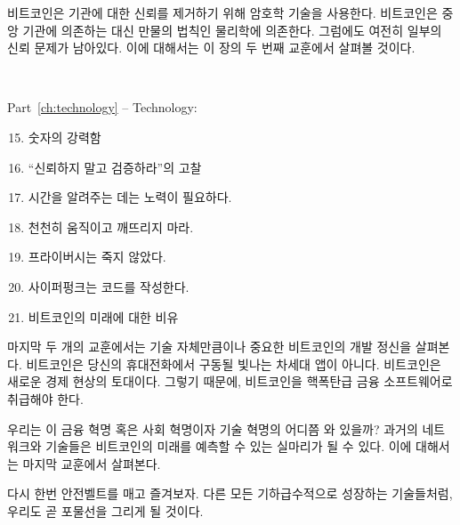 \begin{comment}
	Cryptography is what Bitcoin uses to remove trust in authorities.
	Instead of relying on centralized institutions, the system relies on the final
	authority of our universe: physics. Some grains of trust still remain, however.
	We will examine these grains in the second lesson of this chapter.
\end{comment}
비트코인은 기관에 대한 신뢰를 제거하기 위해 암호학 기술을 사용한다.
비트코인은 중앙 기관에 의존하는 대신 만물의 법칙인 물리학에 의존한다.
그럼에도 여전히 일부의 신뢰 문제가 남아있다.
이에 대해서는 이 장의 두 번째 교훈에서 살펴볼 것이다.

~

\begin{samepage}
	Part~\ref{ch:technology} -- Technology:
	
	\begin{enumerate}
		\setcounter{enumi}{14}
		\item 숫자의 강력함
		\item \enquote{신뢰하지 말고 검증하라}의 고찰
		\item 시간을 알려주는 데는 노력이 필요하다.
		\item 천천히 움직이고 깨뜨리지 마라.
		\item 프라이버시는 죽지 않았다.
		\item 사이퍼펑크는 코드를 작성한다.
		\item 비트코인의 미래에 대한 비유
	\end{enumerate}
\end{samepage}

\begin{comment}
	The last couple of lessons explore the ethos of technological development in
	Bitcoin, which is arguably as important as the technology itself. Bitcoin is not
	the next shiny app on your phone. It is the foundation of a new economic
	reality, which is why Bitcoin should be treated as nuclear-grade financial
	software.
\end{comment}
마지막 두 개의 교훈에서는 기술 자체만큼이나 중요한 비트코인의 개발 정신을 살펴본다.
비트코인은 당신의 휴대전화에서 구동될 빛나는 차세대 앱이 아니다.
비트코인은 새로운 경제 현상의 토대이다. 
그렇기 때문에, 비트코인을 핵폭탄급 금융 소프트웨어로 취급해야 한다.

\begin{comment}
	Where are we in this financial, societal, and technological revolution? 
	
	Networks and technologies of the past may serve as metaphors for Bitcoin's future, which
	are explored in the last lesson of this chapter.
\end{comment}
우리는 이 금융 혁명 혹은 사회 혁명이자 기술 혁명의 어디쯤 와 있을까?
과거의 네트워크와 기술들은 비트코인의 미래를 예측할 수 있는 실마리가 될 수 있다. 이에 대해서는 마지막 교훈에서 살펴본다. 

\begin{comment}
	Once more, strap in and enjoy the ride. Like all exponential technologies, we
	are about to go parabolic.
\end{comment}
다시 한번 안전벨트를 매고 즐겨보자. 다른 모든 기하급수적으로 성장하는 기술들처럼, 우리도 곧 포물선을 그리게 될 것이다.
